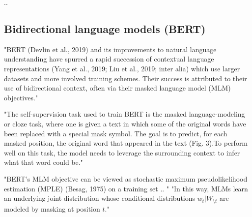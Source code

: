 %

..

\subsection{Bidirectional language models (BERT)}


"BERT (Devlin et al., 2019) and its improvements to natural language understanding have spurred a rapid succession of contextual language representations (Yang et al., 2019; Liu et al., 2019; inter alia) which use larger datasets and more involved training schemes. Their success is attributed to their use of bidirectional context, often via their masked language model (MLM) objectives." \citet{salazar2020masked}

"The self-supervision task used to train BERT is the masked language-modeling  or  cloze  task,  where  one  is  given  a  text  in which  some  of  the  original  words  have  been  replaced  with  a special  mask  symbol.  The  goal  is  to  predict,  for  each  masked position,  the  original  word  that  appeared  in  the  text  (Fig.  3).To perform well on this task, the model needs to leverage the surrounding context to infer what that word could be." \citep{manning2020emergent}





"BERT’s MLM objective can be viewed as stochastic maximum pseudolikelihood estimation (MPLE) \citet{wang2019bert}(Besag, 1975) on a training set  .. " \citep{salazar2020masked}
"In this way, MLMs learn an underlying joint distribution whose conditional distributions 
$w_t | W_{\setminus t}$ 
are modeled by masking at position $t$."  \citep{salazar2020masked}



